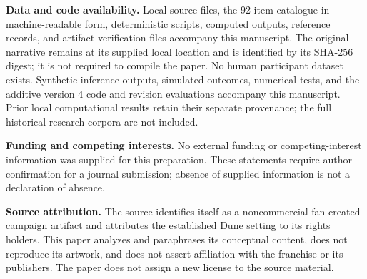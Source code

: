 \textbf{Data and code availability.} Local source files, the 92-item catalogue in machine-readable form, deterministic scripts, computed outputs, reference records, and artifact-verification files accompany this manuscript. The original narrative remains at its supplied local location and is identified by its SHA-256 digest; it is not required to compile the paper. No human participant dataset exists. Synthetic inference outputs, simulated outcomes, numerical tests, and the additive version 4 code and revision evaluations accompany this manuscript. Prior local computational results retain their separate provenance; the full historical research corpora are not included.

\textbf{Funding and competing interests.} No external funding or competing-interest information was supplied for this preparation. These statements require author confirmation for a journal submission; absence of supplied information is not a declaration of absence.

\textbf{Source attribution.} The source identifies itself as a noncommercial fan-created campaign artifact and attributes the established Dune setting to its rights holders. This paper analyzes and paraphrases its conceptual content, does not reproduce its artwork, and does not assert affiliation with the franchise or its publishers. The paper does not assign a new license to the source material.
